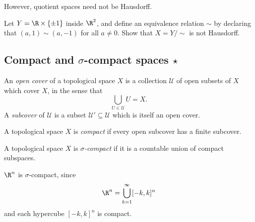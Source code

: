 However, quotient spaces need not be Hausdorff. 

\begin{exercise}
	Let $Y = \R \times \{\pm 1 \}$ inside $\R^2$, and define an equivalence relation $\sim$ by declaring that $(a, 1) \sim (a,-1)$ for all $a \neq 0$. Show that $X = Y/\sim$ is not Hausdorff. 
\end{exercise}

\subsection{Compact and \texorpdfstring{$\sigma$}{sigma}-compact spaces \texorpdfstring{$\star$}{*}}

\begin{definition}
	An \emph{open cover} of a topological space $X$ is a collection $\mathscr{U}$ of open subsets of $X$ which cover $X$, in the sense that \[ \bigcup_{U \in \mathscr{U}} U = X. \]
	A \emph{subcover} of $\mathscr{U}$ is a subset $\mathscr{U}' \subseteq  \mathscr{U}$ which is itself an open cover. 
\end{definition}

\begin{definition}[Compact]
	A topological space $X$ is \emph{compact} if every open subcover has a finite subcover. 
\end{definition}

\begin{definition}
	A topological space $X$ is \emph{$\sigma$-compact} if it is a countable union of compact subspaces. 
\end{definition}

\begin{example}
	$\R^n$ is $\sigma$-compact, since
	\[ \R^n = \bigcup_{k = 1}^\infty [-k,k]^n \]
	and each hypercube $[-k,k]^n$ is compact. 
\end{example}

